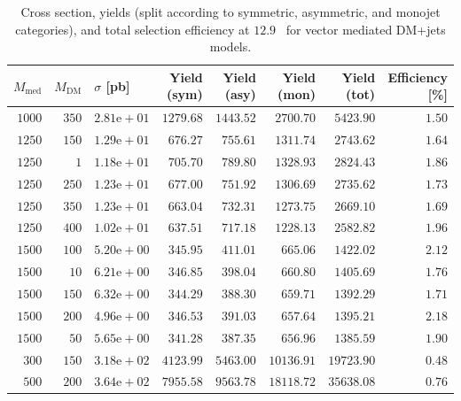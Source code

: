 \clearpage
\begin{table}
    \centering
    {\small
    \begin{tabular}{rrlrrrrr}
    \hline\hline
    $M_{\text{med}}$ & $M_{\text{DM}}$ & $\sigma$ [pb] & Yield (sym) & Yield (asy) & Yield (mon) & Yield (tot) & Efficiency [\%] \\
    \hline
    $1000$ & $350$ & $2.81\text{e}+01$ & $1279.68$ & $1443.52$ & $2700.70$  & $5423.90$  & $1.50$ \\
    $1250$ & $150$ & $1.29\text{e}+01$ & $676.27$  & $755.61$  & $1311.74$  & $2743.62$  & $1.64$ \\
    $1250$ & $1$   & $1.18\text{e}+01$ & $705.70$  & $789.80$  & $1328.93$  & $2824.43$  & $1.86$ \\
    $1250$ & $250$ & $1.23\text{e}+01$ & $677.00$  & $751.92$  & $1306.69$  & $2735.62$  & $1.73$ \\
    $1250$ & $350$ & $1.23\text{e}+01$ & $663.04$  & $732.31$  & $1273.75$  & $2669.10$  & $1.69$ \\
    $1250$ & $400$ & $1.02\text{e}+01$ & $637.51$  & $717.18$  & $1228.13$  & $2582.82$  & $1.96$ \\
    $1500$ & $100$ & $5.20\text{e}+00$ & $345.95$  & $411.01$  & $665.06$   & $1422.02$  & $2.12$ \\
    $1500$ & $10$  & $6.21\text{e}+00$ & $346.85$  & $398.04$  & $660.80$   & $1405.69$  & $1.76$ \\
    $1500$ & $150$ & $6.32\text{e}+00$ & $344.29$  & $388.30$  & $659.71$   & $1392.29$  & $1.71$ \\
    $1500$ & $200$ & $4.96\text{e}+00$ & $346.53$  & $391.03$  & $657.64$   & $1395.21$  & $2.18$ \\
    $1500$ & $50$  & $5.65\text{e}+00$ & $341.28$  & $387.35$  & $656.96$   & $1385.59$  & $1.90$ \\
    $300$  & $150$ & $3.18\text{e}+02$ & $4123.99$ & $5463.00$ & $10136.91$ & $19723.90$ & $0.48$ \\
    $500$  & $200$ & $3.64\text{e}+02$ & $7955.58$ & $9563.78$ & $18118.72$ & $35638.08$ & $0.76$ \\
    \hline\hline
    \end{tabular}
    }
    \caption{Cross section, yields (split according to symmetric, asymmetric, 
        and monojet categories), and total selection efficiency at $12.9$~\ifb 
        for vector mediated DM+jets models.}
    \label{tab:DMV_yld}
\end{table}

